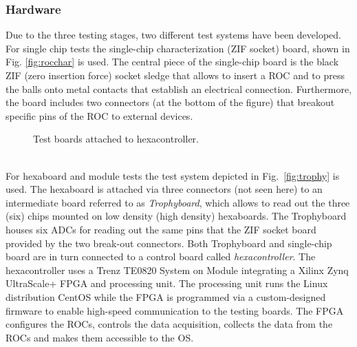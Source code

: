 \documentclass[../../main.tex]{subfiles}
\begin{document}
\subsubsection{Hardware}\label{sec:hw}
Due to the three testing stages, two different test systems have been developed. For single chip tests the single-chip characterization (ZIF socket) board, shown in Fig. \ref{fig:rocchar} is used. The central piece of the single-chip board is the black ZIF (zero insertion force) socket sledge that allows to insert a ROC and to press the balls onto metal contacts that establish an electrical connection. Furthermore, the board includes two connectors (at the bottom of the figure) that breakout specific pins of the ROC to external devices.\\
\begin{figure}[htp]
\centering
{}
\hspace{5mm}
\caption{Test boards attached to hexacontroller.} \label{fig:hw}
\end{figure}
\\
For hexaboard and module tests the test system depicted in Fig.~\ref{fig:trophy} is used. The hexaboard is attached via three connectors (not seen here) to an intermediate board referred to as \textit{Trophyboard}, which allows to read out the three (six) chips mounted on low density (high density) hexaboards. The Trophyboard houses six ADCs for reading out the same pins that the ZIF socket board provided by the two break-out connectors. Both Trophyboard and single-chip board are in turn connected to a control board called \textit{hexacontroller}. The hexacontroller uses a Trenz TE0820 System on Module integrating a Xilinx Zynq UltraScale+ FPGA and processing unit. The processing unit runs the Linux distribution CentOS while the FPGA is programmed via a custom-designed firmware to enable high-speed communication to the testing boards. The FPGA configures the ROCs, controls the data acquisition, collects the data from the ROCs and makes them accessible to the OS.
\end{document}
